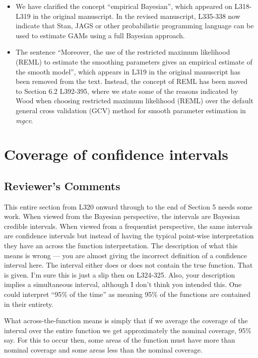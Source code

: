 \documentclass[
]{article}
\begin{document}
\begin{itemize}
\item
  We have clarified the concept ``empirical Bayesian'', which appeared on L318-L319 in the original manuscript. In the revised manuscript, L335-338 now indicate that Stan, JAGS or other probabilistic programming language can be used to estimate GAMs using a full Bayesian approach.
\item
  The sentence ``Moreover, the use of the restricted maximum likelihood (REML) to estimate the smoothing parameters gives an empirical estimate of the smooth model'', which appears in L319 in the original manuscript has been removed from the text. Instead, the concept of REML has been moved to Section 6.2 L392-395, where we state some of the reasons indicated by Wood when choosing restricted maximum likelihood (REML) over the default general cross validation (GCV) method for smooth parameter estimation in \emph{mgcv}.
\end{itemize}

\hypertarget{coverage-of-confidence-intervals}{%
\section{Coverage of confidence intervals}\label{coverage-of-confidence-intervals}}

\hypertarget{reviewers-comments-7}{%
\subsection{Reviewer's Comments}\label{reviewers-comments-7}}

This entire section from L320 onward through to the end of Section 5 needs some work. When viewed from the Bayesian perspective, the intervals are Bayesian credible intervals. When viewed from a frequentist perspective, the same intervals are confidence intervals but instead of having the typical point-wise interpretation they have an across the function interpretation.
The description of what this means is wrong --- you are almost giving the incorrect definition of a confidence interval here. The interval either does or does not contain the true function. That is given. I'm sure this is just a slip then on L324-325.
Also, your description implies a simultaneous interval, although I don't think you intended this. One could interpret ``95\% of the time'' as meaning 95\% of the functions are contained in their entirety.

What across-the-function means is simply that if we average the coverage of the interval over the entire function we get approximately the nominal coverage, 95\% say. For this to occur then, some areas of the function must have more
than nominal coverage and some areas less than the nominal coverage.
\end{document}

